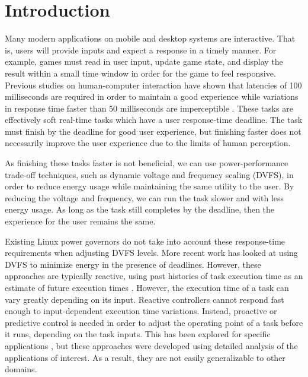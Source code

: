 \section{Introduction}
\label{sec:exec_time_prediction.introduction}

Many modern applications on mobile and desktop systems are interactive.
That is, users will provide inputs and expect a response in a timely manner.
For example, games must read in user input, update game state, and display the
result within a small time window in order for the game to feel responsive.
Previous studies on human-computer interaction have shown that latencies of 100
milliseconds are required in order to maintain a good experience
\cite{endo-osdi96, card-chi91, miller-afips68} while variations in response
time faster than 50 milliseconds are imperceptible \cite{lindgaard-bit06,
eqos-hpca15}. These tasks are effectively soft real-time tasks which have a
user response-time deadline. The task must finish by the deadline for good user
experience, but finishing faster does not necessarily improve the user
experience due to the limits of human perception.

As finishing these tasks faster is not beneficial, we can use power-performance
trade-off techniques, such as dynamic voltage and frequency scaling (DVFS), in
order to reduce energy usage while maintaining the same utility to the user. By
reducing the voltage and frequency, we can run the task slower and with less
energy usage. As long as the task still completes by the deadline, then the
experience for the user remains the same. 

Existing Linux power governors \cite{linux_governors} do not take into account
these response-time requirements when adjusting DVFS levels. More recent work
has looked at using DVFS to minimize energy in the presence of deadlines.
However, these approaches are typically reactive, using past histories of task
execution time as an estimate of future execution times \cite{gu-dac08,
choi-iccad02, pegasus-isca14, nachiappan-hpca15}.  However, the execution time
of a task can vary greatly depending on its input.  Reactive controllers cannot
respond fast enough to input-dependent execution time variations.  Instead,
proactive or predictive control is needed in order to adjust the operating
point of a task before it runs, depending on the task inputs. This has been
explored for specific applications \cite{gu-rtas08, zhu-hpca13, eqos-hpca15,
adrenaline-hpca15}, but these approaches were developed using detailed analysis
of the applications of interest. As a result, they are not easily generalizable
to other domains.

